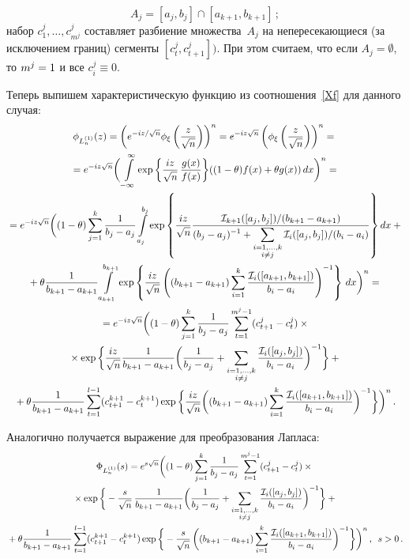 \noindent
\begin{equation*}
A_j=[a_j,b_j]\cap[a_{k+1},b_{k+1}]\,;
\end{equation*}
набор $c_1^j,\ldots,c_{m^j}^j$ составляет разбиение множества~$A_j$
на непересекающиеся (за исключением границ) сегменты
$[c_t^j,c_{t+1}^j])$. При этом считаем, что если $A_j=\emptyset$, то
$m^j\hm=1$ и все $c_i^j\equiv0$.

Теперь выпишем характеристическую функцию из соотношения~\eqref{Xf}
для данного случая:
\begin{multline*}
\phi_{L_n^{(1)}}(z)=\left(e^{-i{z}/{\sqrt{n}}}\phi_\xi\left(\fr
{z}{\sqrt n}\right)\right)^n=e^{-iz\sqrt{n}}\left(\phi_\xi\left(\fr {z}{\sqrt n}\right)\right)^n={}\\
{}= 
e^{-iz\sqrt{n}}\bigg(\int\limits_{-\infty}^\infty\exp{\bigg\{\fr
{iz}{\sqrt n}\,\fr{g(x)}{f(x)}\bigg\}}((1-\theta)
f(x)+\theta  g(x))\,dx\bigg)^{n}={}\\
{}=e^{-iz\sqrt{n}}\bigg((1-\theta)\sum\limits_{j=1}^k\fr{1}{b_j-a_j}
\int\limits_{a_j}^{b_j}\exp{\left\{\fr {iz}{\sqrt n}
\fr{{\Id_{k+1}([a_j,b_j])}/({b_{k+1}-a_{k+1}})}
{(b_j-a_j)^{-1}+\sum_{\substack{i=1,\ldots,k\\i\neq
j}}{\Id_i([a_j,b_j])}/(b_i-a_i)}\right\}}\,dx+{}\\
{}+\theta\fr{1}{b_{k+1}-a_{k+1}}
\int\limits_{a_{k+1}}^{b_{k+1}}\exp\left\{\fr {iz}{\sqrt n}
\left({(b_{k+1}-
a_{k+1})\sum\limits_{i=1}^k\fr{\Id_i([a_{k+1},b_{k+1}])}
{b_i-a_i}}\right)^{-1}\right\}\,dx\bigg)^{n}={}\\
{}=e^{-iz\sqrt{n}}\bigg((1-\theta)\sum\limits_{j=1}^k\fr{1}{b_j-a_j}
\sum\limits_{t=1}^{m^j-1}(c_{t+1}^j-c_t^j)\times{}\\
{}\times\exp{\bigg\{\fr {iz}{\sqrt n}\fr{1}{b_{k+1}-a_{k+1}}
\bigg(\fr{1}{b_j-a_j}+\sum_{\substack{i=1,\ldots,k\\i\neq
j}}\frac{\Id_i([a_j,b_j])}{b_i-a_i}\bigg)^{-1}\bigg\}}+{}\\
{}+\theta\fr{1}{b_{k+1}-a_{k+1}}
\sum\limits_{t=1}^{l-1}(c_{t+1}^{k+1}-c_t^{k+1})\exp{\bigg\{\fr
{iz}{\sqrt n}
\bigg({(b_{k+1}-a_{k+1})\sum\limits_{i=1}^k\fr{\Id_i([a_{k+1},b_{k+1}])}
{b_i-a_i}}\bigg)^{-1}\bigg\}}\bigg)^{n}\,.
\end{multline*}

Аналогично получается выражение для преобразования Лапласа:
\begin{multline*}
\Phi_{L_n^{(1)}}
(s)=e^{s\sqrt{n}}\bigg((1-\theta)\sum\limits_{j=1}^k\fr{1}{b_j-a_j}
\sum\limits_{t=1}^{m^j-1}(c_{t+1}^j-c_t^j)\times{}\\
{}\times\exp{\bigg\{-\fr{s}{\sqrt n}\,\fr{1}{b_{k+1}-a_{k+1}}
\bigg(\fr{1}{b_j-a_j}+\sum_{\substack{i=1,\ldots,k\\i\neq
j}}\fr{\Id_i([a_j,b_j])}{b_i-a_i}\bigg)^{-1}\bigg\}}+{}\\
{}+\theta\fr{1}{b_{k+1}-a_{k+1}}
\sum\limits_{t=1}^{l-1}(c_{t+1}^{k+1}-c_t^{k+1})\exp{\bigg\{-\fr
{s}{\sqrt n}
\,\bigg({(b_{k+1}-a_{k+1})\sum\limits_{i=1}^k\fr{\Id_i([a_{k+1},b_{k+1}])}
{b_i-a_i}}\bigg)^{-1}\bigg\}}\bigg)^{n}\,,\enskip
s>0\notag\,.
\end{multline*}

